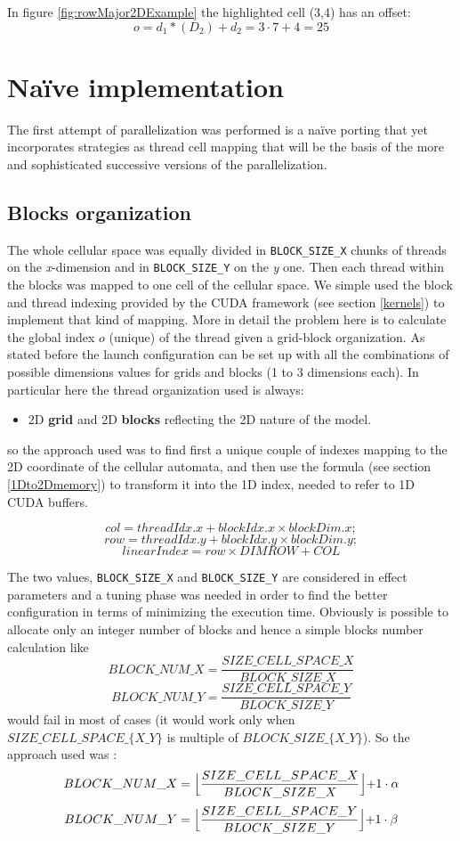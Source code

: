 In figure \ref{fig:rowMajor2DExample} the highlighted cell (3,4) has an offset:
\[
o=d_1*(D_2)+d_2 = 3 \cdot 7 + 4 = 25
\]


\section{Na\"{i}ve implementation}\label{sect:naiveImplementation}
The first attempt of parallelization was performed is a na\"{i}ve porting that yet
incorporates strategies as thread cell mapping that will be the basis of the
more and sophisticated successive versions of the parallelization.
\subsection{Blocks organization}
The whole cellular space was equally divided in \texttt{BLOCK\_SIZE\_X} chunks
of threads on the \textit{x}-dimension and in \texttt{BLOCK\_SIZE\_Y} on the
\textit{y} one. Then each thread within the blocks was mapped to one cell
of the cellular space. We simple used the block and thread indexing provided by
the CUDA framework (see section \ref{kernels}) to implement that kind of
mapping.
More in detail the problem here is to calculate the global index \(o\) (unique)
of the thread given a grid-block organization. As stated before the
launch configuration can be set up with all the combinations of possible
dimensions values for grids and blocks (1 to 3 dimensions each). In particular
here the thread organization used is always:
\begin{itemize}
  \item 2D \textbf{grid} and 2D \textbf{blocks} reflecting the 2D nature of the
  model.
\end{itemize}
so the approach used was to find first a unique couple of indexes mapping to the
2D coordinate of the cellular automata, and then use the formula (see section
\ref{1Dto2Dmemory}) to transform it into the 1D index, needed to refer to 1D
CUDA buffers.

\[col=threadIdx.x+blockIdx.x \times blockDim.x;\]
\[row=threadIdx.y+blockIdx.y \times blockDim.y;\]
\[linearIndex=row \times DIMROW + COL\]



The two values, \texttt{BLOCK\_SIZE\_X} and
\texttt{BLOCK\_SIZE\_Y} are considered in effect parameters and a tuning
phase was needed in order to find the better configuration in terms of
minimizing the execution time.
Obviously is possible to allocate only an integer number of blocks and hence a
simple blocks number calculation like
\[
BLOCK\_NUM\_X=\frac{SIZE\_CELL\_SPACE\_X}{BLOCK\_SIZE\_X} \]
\[
BLOCK\_NUM\_Y=\frac{SIZE\_CELL\_SPACE\_Y}{BLOCK\_SIZE\_Y}
\]
would fail in most of cases (it would work only when\\
\(SIZE\_CELL\_SPACE\_\{X\_Y\}\) is multiple of \(BLOCK\_SIZE\_\{X\_Y\}\)). So
the approach used was :
\[
BLOCK\_NUM\_X=\Bigl\lfloor\frac{SIZE\_CELL\_SPACE\_X}{BLOCK\_SIZE\_X}\Bigl\rfloor + 1 \cdot \alpha\]
\[
BLOCK\_NUM\_Y=\Bigl\lfloor\frac{SIZE\_CELL\_SPACE\_Y}{BLOCK\_SIZE\_Y}\Bigl\rfloor
+ 1
\cdot
\beta
\]

